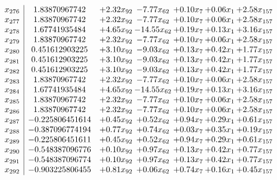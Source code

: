 \documentclass[8pt]{article}
\begin{document}
\[\begin{array}{c| c c@{\hskip 2pt} c@{\hskip 2pt} c@{\hskip 2pt} c@{\hskip 2pt} c@{\hskip 2pt} }
 x_{276}   &  1.83870967742 & +  2.32 x_{92} & -7.77 x_{62} & +  0.10 x_{7} & +  0.06 x_{1} & +  2.58 x_{157}\\
 x_{277}   &  1.83870967742 & +  2.32 x_{92} & -7.77 x_{62} & +  0.10 x_{7} & +  0.06 x_{1} & +  2.58 x_{157}\\
 x_{278}   &  1.67741935484 & +  4.65 x_{92} & -14.55 x_{62} & +  0.19 x_{7} & +  0.13 x_{1} & +  3.16 x_{157}\\
 x_{279}   &  1.83870967742 & +  2.32 x_{92} & -7.77 x_{62} & +  0.10 x_{7} & +  0.06 x_{1} & +  2.58 x_{157}\\
 x_{280}   &  0.451612903225 & +  3.10 x_{92} & -9.03 x_{62} & +  0.13 x_{7} & +  0.42 x_{1} & +  1.77 x_{157}\\
 x_{281}   &  0.451612903225 & +  3.10 x_{92} & -9.03 x_{62} & +  0.13 x_{7} & +  0.42 x_{1} & +  1.77 x_{157}\\
 x_{282}   &  0.451612903225 & +  3.10 x_{92} & -9.03 x_{62} & +  0.13 x_{7} & +  0.42 x_{1} & +  1.77 x_{157}\\
 x_{283}   &  1.83870967742 & +  2.32 x_{92} & -7.77 x_{62} & +  0.10 x_{7} & +  0.06 x_{1} & +  2.58 x_{157}\\
 x_{284}   &  1.67741935484 & +  4.65 x_{92} & -14.55 x_{62} & +  0.19 x_{7} & +  0.13 x_{1} & +  3.16 x_{157}\\
 x_{285}   &  1.83870967742 & +  2.32 x_{92} & -7.77 x_{62} & +  0.10 x_{7} & +  0.06 x_{1} & +  2.58 x_{157}\\
 x_{286}   &  1.83870967742 & +  2.32 x_{92} & -7.77 x_{62} & +  0.10 x_{7} & +  0.06 x_{1} & +  2.58 x_{157}\\
 x_{287}   &  -0.225806451614 & +  0.45 x_{92} & +  0.52 x_{62} & +  0.94 x_{7} & +  0.29 x_{1} & +  0.61 x_{157}\\
 x_{288}   &  -0.387096774194 & +  0.77 x_{92} & +  0.74 x_{62} & +  0.03 x_{7} & +  0.35 x_{1} & +  0.19 x_{157}\\
 x_{289}   &  -0.225806451611 & +  0.45 x_{92} & +  0.52 x_{62} & +  0.94 x_{7} & +  0.29 x_{1} & +  0.61 x_{157}\\
 x_{290}   &  -0.548387096776 & +  0.10 x_{92} & +  0.97 x_{62} & +  0.13 x_{7} & +  0.42 x_{1} & +  0.77 x_{157}\\
 x_{291}   &  -0.548387096774 & +  0.10 x_{92} & +  0.97 x_{62} & +  0.13 x_{7} & +  0.42 x_{1} & +  0.77 x_{157}\\
 x_{292}   &  -0.903225806455 & +  0.81 x_{92} & +  0.06 x_{62} & +  0.74 x_{7} & +  0.16 x_{1} & +  0.45 x_{157}\\

\end{array}\]
\end{document}
